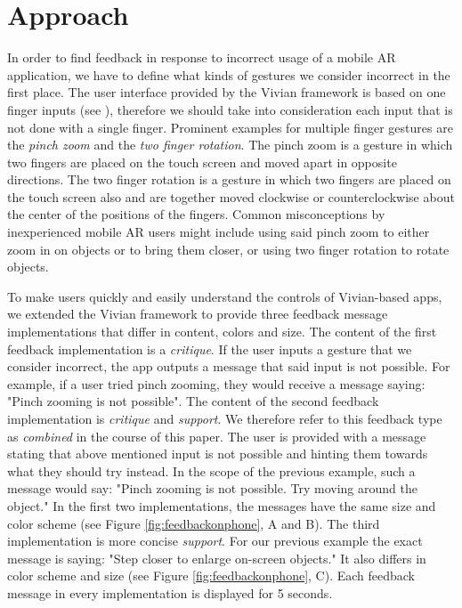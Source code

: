 \documentclass[11pt, a4paper]{article}
\begin{document}
	\section*{Approach}\label{sec:approach}
		In order to find feedback in response to incorrect usage of a mobile \ac{AR} application, we have to define what kinds of gestures we consider incorrect in the first place. The user interface provided by the Vivian framework is based on one finger inputs (see ), therefore we should take into consideration each input that is not done with a single finger. Prominent examples for multiple finger gestures are the \emph{pinch zoom} and the \emph{two finger rotation}. The pinch zoom is a gesture in which two fingers are placed on the touch screen and moved apart in opposite directions. The two finger rotation is a gesture in which two fingers are placed on the touch screen also and are together moved clockwise or counterclockwise about the center of the positions of the fingers. Common misconceptions by inexperienced mobile \ac{AR} users might include using said pinch zoom to either zoom in on objects or to bring them closer, or using two finger rotation to rotate objects.

		To make users quickly and easily understand the controls of Vivian-based apps, we extended the Vivian framework to provide three feedback message implementations that differ in content, colors and size. The content of the first feedback implementation is a \emph{critique}. If the user inputs a gesture that we consider incorrect, the app outputs a message that said input is not possible. For example, if a user tried pinch zooming, they would receive a message saying: "Pinch zooming is not possible". The content of the second feedback implementation is \emph{critique} and \emph{support}. We therefore refer to this feedback type as \emph{combined} in the course of this paper. The user is provided with a message stating that above mentioned input is not possible and hinting them towards what they should try instead. In the scope of the previous example, such a message would say: "Pinch zooming is not possible. Try moving around the object." In the first two implementations, the messages have the same size and color scheme (see Figure \ref{fig:feedbackonphone}, A and B). The third implementation is more concise \emph{support}. For our previous example the exact message is saying: "Step closer to enlarge on-screen objects." It also differs in color scheme and size (see Figure \ref{fig:feedbackonphone}, C). Each feedback message in every implementation is displayed for 5 seconds.
\end{document}
